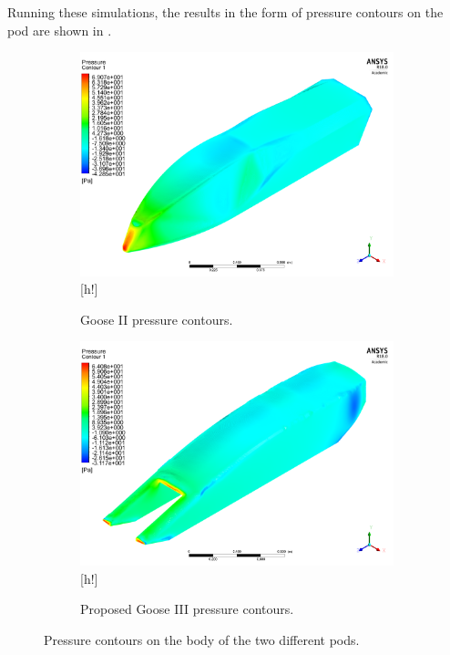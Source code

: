 \documentclass[main.tex]{subfiles}
\begin{document}
Running these simulations, the results in the form of pressure contours on the pod are shown in .
\begin{figure}
\centering
\begin{subfigure}[h]{0.75\textwidth}
\includegraphics[width=\textwidth]{images/Test_3_Pressure_Contour.png}[h!]
\caption{Goose II pressure contours.}
\end{subfigure}
\begin{subfigure}[h]{0.75\textwidth}
\includegraphics[width=\textwidth]{images/Test_4_Pressure_Contour.png}[h!]
\caption{Proposed Goose III pressure contours.}
\end{subfigure}
\caption{Pressure contours on the body of the two different pods.}
\label{fig:pressurecontours}
\end{figure}
\end{document}
